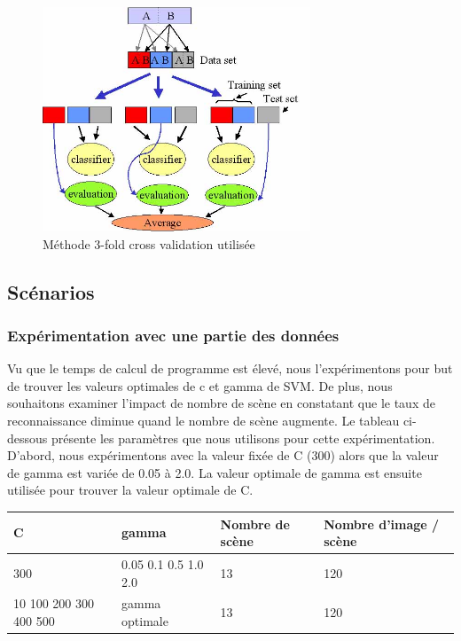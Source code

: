 \documentclass[french,12pt,a4paper,oneside,notitlepage]{report}
\begin{document}
\begin{figure}[ht]
	\begin{center}
	  \includegraphics[width=8cm]{3fold.jpg}
	\end{center}
	 \caption{Méthode 3-fold cross validation utilisée}
\end{figure}
\subsection{Scénarios}
\subsubsection{Expérimentation avec une partie des données}
Vu que le temps de calcul de programme est élevé, nous l'expérimentons pour but de 
trouver les valeurs optimales de c et gamma de SVM. De plus, nous souhaitons examiner 
l'impact de nombre de scène en constatant que le taux de reconnaissance diminue quand le 
nombre de scène augmente. Le tableau ci-dessous présente les paramètres que nous 
utilisons pour cette expérimentation. D'abord, nous expérimentons avec la valeur fixée de 
C (300) alors que la valeur de gamma est variée de 0.05 à 2.0. La valeur optimale de 
gamma est ensuite utilisée pour trouver la valeur optimale de C.

\begin{table}[!ht]
  \begin{center}
	\begin{tabular}{|l|l|l|l|}
	  \hline
	  C& gamma & Nombre de scène & Nombre d'image / scène\\
	  \hline
	  300 & 0.05 0.1 0.5 1.0 2.0 & 13 & 120\\
	  \hline
	  10 100 200 300 400 500 & gamma optimale & 13 & 120\\
	  \hline
	\end{tabular}
  \end{center}
\end{table}
\end{document}
